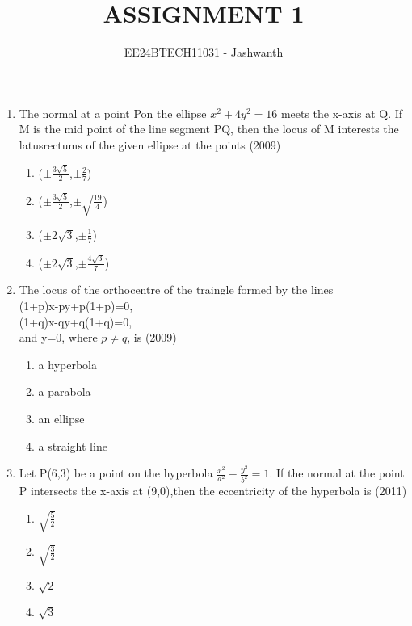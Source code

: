 \documentclass[journal,12pt,twocolumn]{IEEEtran}
\theoremstyle{remark}
\begin{document}

\vspace{3cm}

\title{ASSIGNMENT 1}
\author{EE24BTECH11031 - Jashwanth}
\maketitle
\newpage
\bigskip

\begin{enumerate}
\item The normal at a point Pon the ellipse  $x^2 +4y^2=16$ meets the x-axis at Q. If M is the mid point of the line segment PQ, then the locus of M interests the latusrectums of the given ellipse at the points
	\hfill (2009)
		\begin{enumerate}
			\item ($\pm\frac{3\sqrt{5}}{2}$,$\pm\frac{2}{7}$)
			\item ($\pm\frac{3\sqrt{5}}{2}$,$\pm\sqrt{\frac{19}{4}}$)
			\item ($\pm2\sqrt{3}$,$\pm\frac{1}{7}$)
			\item ($\pm2\sqrt{3}$,$\pm\frac{4\sqrt{3}}{7}$)	
		\end{enumerate}
		
	\item The locus of the orthocentre of the traingle formed by the lines\\
		\hspace{2cm}(1+p)x-py+p(1+p)=0,\\
	        \hspace{2cm}(1+q)x-qy+q(1+q)=0,\\
		and y=0, where $p \neq q$, is
		\hfill(2009)
\begin{enumerate}
	\item a hyperbola
	\item a parabola
	\item an ellipse
	\item a straight line
\end{enumerate}

\item Let P(6,3) be a point on the hyperbola $\frac{x^2}{a^2}-\frac{y^2}{b^2}=1$. If the normal at the point P intersects the x-axis at (9,0),then the eccentricity of the hyperbola is
	\hfill (2011)\\
		\begin{enumerate}
			\item$\sqrt{\frac{5}{2}}$
			\item$\sqrt{\frac{3}{2}}$
			\item$\sqrt{2}$
			\item$\sqrt{3}$
		\end{enumerate}


\end{enumerate}
\end{document}
